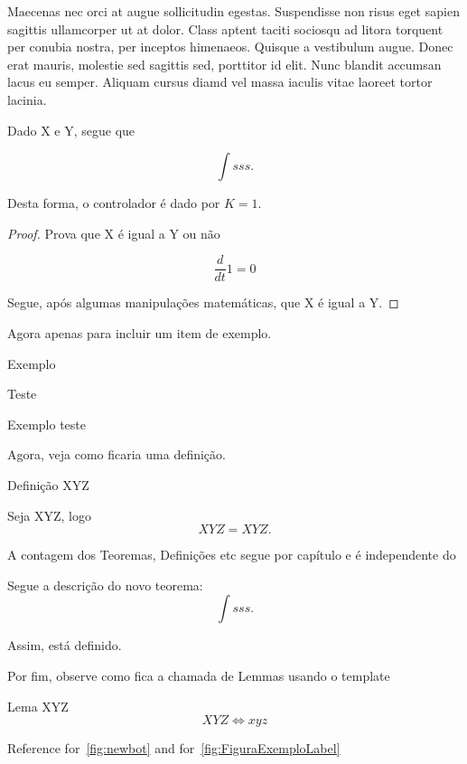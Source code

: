 Maecenas nec orci at augue sollicitudin egestas. Suspendisse non risus
eget sapien sagittis ullamcorper ut at dolor. Class aptent taciti
sociosqu ad litora torquent per conubia nostra, per inceptos himenaeos.
Quisque a vestibulum augue. Donec erat mauris, molestie sed sagittis
sed, porttitor id elit. Nunc blandit accumsan lacus eu semper. Aliquam
cursus diamd vel massa iaculis vitae laoreet tortor lacinia.
\begin{thm}
Dado X e Y, segue que 

\[
\int sss.
\]

Desta forma, o controlador é dado por $K=1$.
\end{thm}
\begin{proof}
Prova que X é igual a Y ou não

\[
\frac{d}{dt}1=0
\]

Segue, após algumas manipulações matemáticas, que X é igual a Y.
\end{proof}
Agora apenas para incluir um item de exemplo.
\begin{example}
Exemplo

Teste

Exemplo teste
\end{example}
Agora, veja como ficaria uma definição.
\begin{defn}
Definição XYZ

Seja XYZ, logo
\[
XYZ=XYZ.
\]
\end{defn}
A contagem dos Teoremas, Definições etc segue por capítulo e é independente
do 
\begin{thm}
Segue a descrição do novo teorema: 
\[
\int sss.
\]

Assim, está definido.

Por fim, observe como fica a chamada de Lemmas usando o template
\end{thm}
\begin{lem}[TESTE]
 Lema XYZ
\[
XYZ\iff xyz
\]
\end{lem}

Reference for \figurename\,\ref{fig:newbot} and for \figurename\,\ref{fig:FiguraExemploLabel}